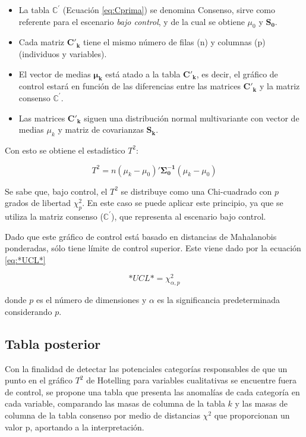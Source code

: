 \documentclass[water,article,submit,moreauthors,pdftex]{mdpi}
\providecommand{\tightlist}{%
  \setlength{\itemsep}{0pt}\setlength{\parskip}{4pt}}
\begin{document}
\begin{itemize}
\tightlist
\item
  La tabla \(\mathbb{C}^{'}\) (Ecuación \ref{eq:Cprima}) se denomina
  Consenso, sirve como referente para el escenario \emph{bajo control},
  y de la cual se obtiene \(\mu_{0}\) y \(\mathbf{S_0}\).\\
\item
  Cada matriz \(\mathbf{C'_k}\) tiene el mismo número de filas (n) y
  columnas (p) (individuos y variables).
\item
  El vector de medias \(\mathbf{\mu_k}\) está atado a la tabla
  \(\mathbf{C'_k}\), es decir, el gráfico de control estará en función
  de las diferencias entre las matrices \(\mathbf{C'_k}\) y la matriz
  consenso \(\mathbf{\mathbb{C^{'}}}\).
\item
  Las matrices \(\mathbf{C'_k}\) siguen una distribución normal
  multivariante con vector de medias \(\mu_{k}\) y matriz de covarianzas
  \(\mathbf{S_k}\).
\end{itemize}

Con esto se obtiene el estadístico \(T^2\):

\begin{equation}
T^2=n (\mu_{k}-\mu_{0})'\mathbf{\Sigma_{0}^{-1}}(\mu_{k}-\mu_{0})
\label{eq:T2}
\end{equation}

Se sabe que, bajo control, el \(T^2\) se distribuye como una
Chi-cuadrado con \(p\) grados de libertad \(\chi^2_p\). En este caso se
puede aplicar este principio, ya que se utiliza la matriz consenso
(\(\mathbb{C}^{'}\)), que representa al escenario bajo control.

Dado que este gráfico de control está basado en distancias de
Mahalanobis ponderadas, sólo tiene límite de control superior. Este
viene dado por la ecuación \ref{eq:*UCL*}

\begin{equation}
*UCL*=\chi^2_{\alpha,p}
\label{eq:*UCL*}
\end{equation}

donde \(p\) es el número de dimensiones y \(\alpha\) es la significancia
predeterminada considerando \(p\).

\hypertarget{tabla-posterior}{%
\subsection{Tabla posterior}\label{tabla-posterior}}

Con la finalidad de detectar las potenciales categorías responsables de
que un punto en el gráfico \(T^2\) de Hotelling para variables
cualitativas se encuentre fuera de control, se propone una tabla que
presenta las anomalías de cada categoría en cada variable, comparando
las masas de columna de la tabla \(k\) y las masas de columna de la
tabla consenso por medio de distancias \(\chi^2\) que proporcionan un
valor p, aportando a la interpretación.
\end{document}

